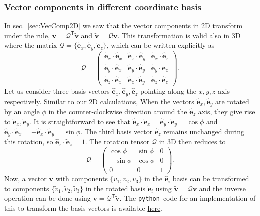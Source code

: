\documentclass{article}
\def\eh{\hat{\mathbf{e}}}
\def\et{\tilde{\mathbf{e}}}
\def\ehx{\hat{\mathbf{e}}_x}
\def\ehy{\hat{\mathbf{e}}_y}
\def\ehz{\hat{\mathbf{e}}_z}
\def\etx{\tilde{\mathbf{e}}_x}
\def\ety{\tilde{\mathbf{e}}_y}
\def\etz{\tilde{\mathbf{e}}_z}
\def\v{\mathbf{v}}
\def\vt{\tilde{\mathbf{v}}}
\def\vts{\tilde{v}}
\def\Q{\mathcal{Q}}
\def\T{\mathsf{T}}
\begin{document}
\subsubsection*{Vector components in different coordinate basis}
In sec.~\ref{sec:VecComp2D} we saw that the vector components in 2D transform under the rule, $\v = \Q^\T \vt$ and $\vt = \Q \v$. This transformation is valid also in 3D where the matrix $\Q = \{ \et_x, \et_y, \et_z \}$, which can be written explicitly as
\[
  \Q  =
  \begin{pmatrix} 
  \etx \cdot \ehx & \etx \cdot \ehy & \etx \cdot \ehz\\
  \ety \cdot \ehx & \ety\cdot \ehy & \ety\cdot \ehz\\
  \etz \cdot \ehx & \etz\cdot \ehy & \etz\cdot \ehz
  \end{pmatrix}.
\]
Let us consider three basis vectors $\ehx, \ehy, \ehz$ pointing along the $x, y, z$-axis respectively. Similar to our 2D calculations, When the vectors $\ehx, \ehy$ are rotated by an angle $\phi$ in the counter-clockwise direction around the $\ehz$ axis, they give rise to $\etx, \ety$. It is straightforward to see that $\ehx\cdot\etx=\ehy\cdot\ety=\cos \phi$ and $\ehy\cdot\etx = -\ehx\cdot\ety = \sin \phi$. The third basis vector $\ehz$ remains unchanged during this rotation, so $\ehz\cdot\etz = 1$. The rotation tensor $\Q$ in 3D then reduces to
\[
  \Q  = 
  \begin{pmatrix} 
  \cos \phi & \sin \phi & 0 \\
  -\sin \phi & \cos \phi & 0 \\
  0 & 0 & 1
  \end{pmatrix}.
\]
\noindent Now, a vector $\v$ with components $\{ v_1, v_2, v_3 \}$ in the $\eh_i$ basis can be transformed to components $\{ \vts_1, \vts_2, \vts_3 \}$ in the rotated basis $\et_i$ using $\vt = \Q \v$  and the inverse operation can be done using  $\v = \Q^\T \vt$. The \texttt{python}--code for an implementation of this to transform the basis vectors is available \href{https://github.com/sgangaprasath/RotationTut/blob/main/Rotations.ipynb}{here}.
\end{document}
